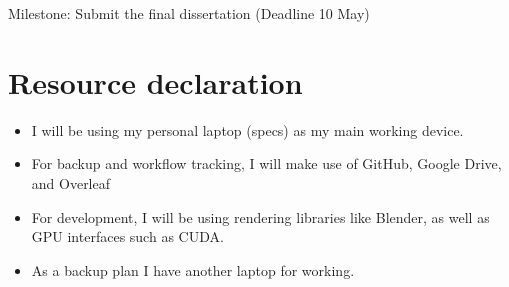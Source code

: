 \documentclass[12pt]{article}
\begin{document}
Milestone: Submit the final dissertation (Deadline 10 May)

\section{Resource declaration}

\begin{itemize}
\item I will be using my personal laptop (specs) as my main working device.
\item For backup and workflow tracking, I will make use of GitHub, Google Drive, and Overleaf
\item For development, I will be using rendering libraries like Blender, as well as GPU interfaces such as CUDA.
\item As a backup plan I have another laptop for working.
\end{itemize}



\end{document}
